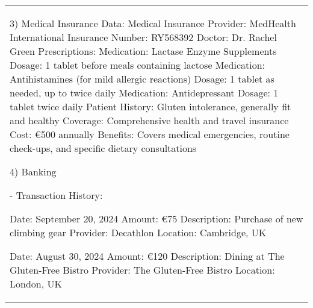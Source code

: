 \begin{table*}[!ht]
    \centering
    \begin{tabular}{p{}}
    \toprule
   

    3) Medical Insurance Data: \newline
        Medical Insurance Provider: MedHealth International \newline
        Insurance Number: RY568392 \newline
        Doctor: Dr. Rachel Green \newline
        Prescriptions: \newline
        Medication: Lactase Enzyme Supplements \newline
        Dosage: 1 tablet before meals containing lactose \newline
        Medication: Antihistamines (for mild allergic reactions) \newline
        Dosage: 1 tablet as needed, up to twice daily \newline
        Medication: Antidepressant  \newline
        Dosage: 1 tablet twice daily \newline
        Patient History: Gluten intolerance, generally fit and healthy \newline
        Coverage: Comprehensive health and travel insurance \newline
        Cost: €500 annually \newline
        Benefits: Covers medical emergencies, routine check-ups, and specific dietary consultations \newline

    4) Banking \newline
    
        - Transaction History: \newline

            Date: September 20, 2024 \newline
            Amount: €75 \newline
            Description: Purchase of new climbing gear \newline
            Provider: Decathlon \newline
            Location: Cambridge, UK \newline

            Date: August 30, 2024 \newline
            Amount: €120 \newline
            Description: Dining at The Gluten-Free Bistro \newline
            Provider: The Gluten-Free Bistro \newline
            Location: London, UK \newline


\end{tabular}
\end{table*}
